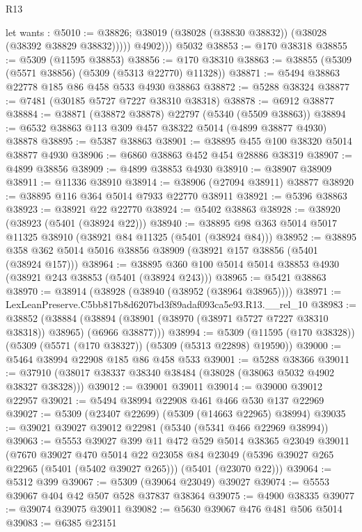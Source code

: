 \begin{lexlean}{R13}
\begin{coremodule}
            let wants : @5010 := @38826;
            @38019 (@38028 (@38830 @38832)) (@38028 (@38392 @38829 @38832)))))
          @4902)))
    @5032
@38853 := @170 @38318
@38855 := @5309 (@11595 @38853)
@38856 := @170 @38310
@38863 := @38855 (@5309 (@5571 @38856) (@5309 (@5313 @22770) @11328))
@38871 := @5494 @38863 @22778 @185 @86 @458 @533 @4930 @38863
@38872 := @5288 @38324
@38877 := @7481 (@30185 @5727 @7227 @38310 @38318)
@38878 := @6912 @38877
@38884 := @38871 (@38872 @38878) @22797 (@5340 (@5509 @38863))
@38894 := @6532 @38863 @113 @309 @457 @38322 @5014 (@4899 @38877 @4930) @38878
@38895 := @5387 @38863
@38901 := @38895 @455 @100 @38320 @5014 @38877 @4930
@38906 := @6860 @38863 @452 @454 @28886 @38319
@38907 := @4899 @38856
@38909 := @4899 @38853 @4930
@38910 := @38907 @38909
@38911 := @11336 @38910
@38914 := @38906 (@27094 @38911) @38877
@38920 := @38895 @116 @364 @5014 @7933 @22770 @38911
@38921 := @5396 @38863
@38923 := @38921 @22 @22770
@38924 := @5402 @38863
@38928 := @38920 (@38923 (@5401 (@38924 @22)))
@38940 := @38895 @98 @363 @5014 @5017 @11325 @38910 (@38921 @84 @11325 (@5401 (@38924 @84)))
@38952 := @38895 @358 @362 @5014 @5016 @38856 @38909 (@38921 @157 @38856 (@5401 (@38924 @157)))
@38964 := @38895 @360 @100 @5014 @5014 @38853 @4930 (@38921 @243 @38853 (@5401 (@38924 @243)))
@38965 := @5421 @38863
@38970 := @38914 (@38928 (@38940 (@38952 (@38964 @38965))))
@38971 := LexLeanPreserve.C5bb817b8d6207bd3f89adaf093ca5e93.R13.__rel_10
@38983 := @38852
    (@38884 (@38894 (@38901 (@38970 (@38971 @5727 @7227 @38310 @38318)) @38965) (@6966 @38877)))
@38994 := @5309 (@11595 (@170 @38328)) (@5309 (@5571 (@170 @38327)) (@5309 (@5313 @22898) @19590))
@39000 := @5464 @38994 @22908 @185 @86 @458 @533
@39001 := @5288 @38366
@39011 := @37910 (@38017 @38337 @38340 @38484 (@38028 (@38063 @5032 @4902 @38327 @38328)))
@39012 := @39001 @39011
@39014 := @39000 @39012 @22957
@39021 := @5494 @38994 @22908 @461 @466 @530 @137 @22969
@39027 := @5309 (@23407 @22699) (@5309 (@14663 @22965) @38994)
@39035 := @39021 @39027 @39012 @22981 (@5340 (@5341 @466 @22969 @38994))
@39063 := @5553
    @39027
    @399
    @11
    @472
    @529
    @5014
    @38365
    @23049
    @39011
    (@7670
      @39027
      @470
      @5014
      @22
      @23058
      @84
      @23049
      (@5396 @39027 @265 @22965 (@5401 (@5402 @39027 @265)))
      (@5401 (@23070 @22)))
@39064 := @5312 @399
@39067 := @5309 (@39064 @23049) @39027
@39074 := @5553 @39067 @404 @42 @507 @528 @37837 @38364
@39075 := @4900 @38335
@39077 := @39074 @39075 @39011
@39082 := @5630 @39067 @476 @481 @506 @5014
@39083 := @6385 @23151

\end{coremodule}
\end{lexlean}
